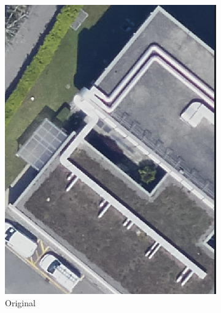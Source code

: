 \begin{figure}[H]
    \centering
    \begin{subfigure}[b]{0.49\textwidth}
        \centering
        \includegraphics[width=\textwidth]{02-main/figures/ch3/ch3_labellisation_02_exemples_01_acrotere1.png}
        \caption{Original}
        \label{fig:ch3_labellisation_02_exemples_01_acrotere1}
    \end{subfigure}
    \hfill
    \begin{subfigure}[b]{0.485\textwidth}
        \centering

\end{subfigure}
\end{figure}

